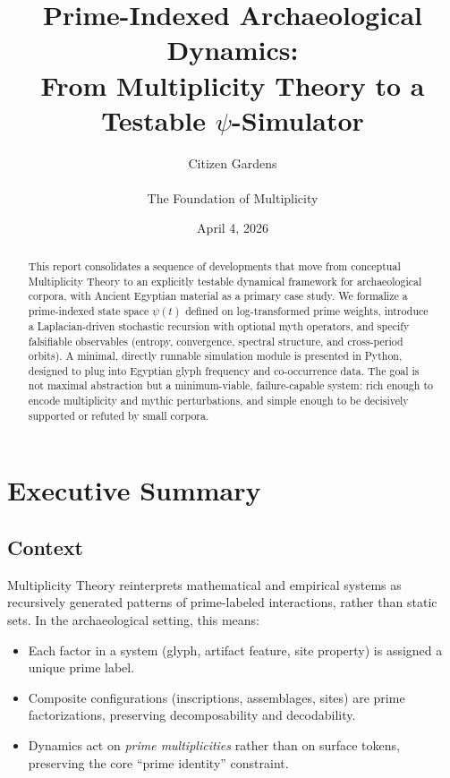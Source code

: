 \documentclass[11pt]{article}
\title{Prime-Indexed Archaeological Dynamics:\\
From Multiplicity Theory to a Testable \texorpdfstring{$\psi$}{psi}-Simulator}
\author{Citizen Gardens \\ \\ The Foundation of Multiplicity}
\date{April 4, 2026}
\begin{document}
\maketitle

\begin{abstract}
This report consolidates a sequence of developments that move from
conceptual Multiplicity Theory to an explicitly testable dynamical
framework for archaeological corpora, with Ancient Egyptian material
as a primary case study. We formalize a prime-indexed state space
\(\psi(t)\) defined on log-transformed prime weights, introduce a
Laplacian-driven stochastic recursion with optional myth operators,
and specify falsifiable observables (entropy, convergence, spectral
structure, and cross-period orbits). A minimal, directly runnable
simulation module is presented in Python, designed to plug into
Egyptian glyph frequency and co-occurrence data. The goal is not
maximal abstraction but a minimum-viable, failure-capable system:
rich enough to encode multiplicity and mythic perturbations, and
simple enough to be decisively supported or refuted by small
corpora.
\end{abstract}
\newpage
\tableofcontents
\newpage
\section{Executive Summary}

\subsection{Context}

Multiplicity Theory reinterprets mathematical and empirical systems
as recursively generated patterns of prime-labeled interactions,
rather than static sets. In the archaeological setting, this means:
\begin{itemize}[nosep]
  \item Each factor in a system (glyph, artifact feature, site property)
        is assigned a unique prime label.
  \item Composite configurations (inscriptions, assemblages, sites) are
        prime factorizations, preserving decomposability and decodability.
  \item Dynamics act on \emph{prime multiplicities} rather than on
        surface tokens, preserving the core ``prime identity'' constraint.
\end{itemize}
\end{document}
